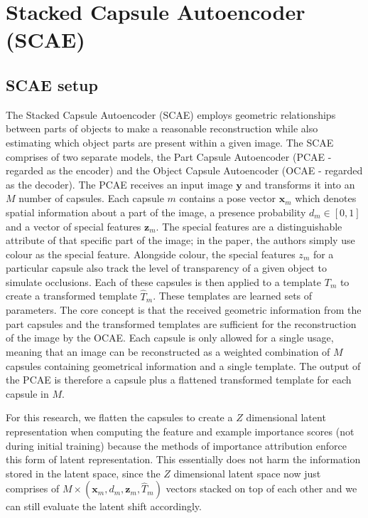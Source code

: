 \section{Stacked Capsule Autoencoder (SCAE)}
\label{app:scae}

\subsection{SCAE setup}
\label{app:scaesetup}
The Stacked Capsule Autoencoder \cite{stackedcaps2019} (SCAE) employs geometric relationships between parts of objects to make a reasonable reconstruction while also estimating which object parts are present within a given image. The SCAE comprises of two separate models, the Part Capsule Autoencoder (PCAE - regarded as the encoder) and the Object Capsule Autoencoder (OCAE - regarded as the decoder). The PCAE receives an input image $\mathbf{y}$ and transforms it into an $M$ number of capsules. Each capsule $m$ contains a pose vector $\mathbf{x}_m$ which denotes spatial information about a part of the image, a presence probability $d_m \in [0, 1]$ and a vector of special features $\mathbf{z}_m$. The special features are a distinguishable attribute of that specific part of the image; in the paper, the authors simply use colour as the special feature. Alongside colour, the special features $z_m$ for a particular capsule also track the level of transparency of a given object to simulate occlusions. Each of these capsules is then applied to a template $T_m$ to create a transformed template $\hat{T}_m$. These templates are learned sets of parameters. The core concept is that the received geometric information from the part capsules and the transformed templates are sufficient for the reconstruction of the image by the OCAE. Each capsule is only allowed for a single usage, meaning that an image can be reconstructed as a weighted combination of $M$ capsules containing geometrical information and a single template. The output of the PCAE is therefore a capsule plus a flattened transformed template for each capsule in $M$.

For this research, we flatten the capsules to create a $Z$ dimensional latent representation when computing the feature and example importance scores (not during initial training) because the methods of importance attribution enforce this form of latent representation. This essentially does not harm the information stored in the latent space, since the $Z$ dimensional latent space now just comprises of $M \times (\mathbf{x}_m, d_m, \mathbf{z}_m, \hat{T}_m)$ vectors stacked on top of each other and we can still evaluate the latent shift accordingly.

